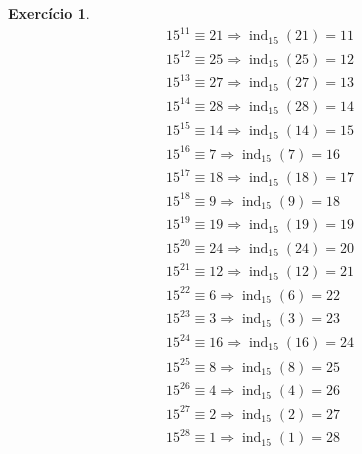 \documentclass[a4paper,12pt]{article}
\DeclareMathOperator{\ind}{ind}
\theoremstyle{definition}
\newtheorem{exercise}{Exercício}%
\begin{document}
\begin{exercise}
\begin{align*}
	15^{11}\equiv 21 \Longrightarrow \ind_{15}(21) = 11 \\
	15^{12}\equiv 25 \Longrightarrow \ind_{15}(25) = 12 \\
	15^{13}\equiv 27 \Longrightarrow \ind_{15}(27) = 13 \\
	15^{14}\equiv 28 \Longrightarrow \ind_{15}(28) = 14 \\
	15^{15}\equiv 14 \Longrightarrow \ind_{15}(14) = 15 \\
	15^{16}\equiv 7 \Longrightarrow \ind_{15}(7) = 16 \\
	15^{17}\equiv 18 \Longrightarrow \ind_{15}(18) = 17 \\
	15^{18}\equiv 9 \Longrightarrow \ind_{15}(9) = 18 \\
	15^{19}\equiv 19 \Longrightarrow \ind_{15}(19) = 19 \\
	15^{20}\equiv 24 \Longrightarrow \ind_{15}(24) = 20 \\
	15^{21}\equiv 12 \Longrightarrow \ind_{15}(12) = 21 \\
	15^{22}\equiv 6 \Longrightarrow \ind_{15}(6) = 22 \\
	15^{23}\equiv 3 \Longrightarrow \ind_{15}(3) = 23 \\
	15^{24}\equiv 16 \Longrightarrow \ind_{15}(16) = 24 \\
	15^{25}\equiv 8 \Longrightarrow \ind_{15}(8) = 25 \\
	15^{26}\equiv 4 \Longrightarrow \ind_{15}(4) = 26 \\
	15^{27}\equiv 2 \Longrightarrow \ind_{15}(2) = 27 \\
	15^{28}\equiv 1 \Longrightarrow \ind_{15}(1) = 28 \\
	\end{align*}
	\end{exercise}
\end{document}
